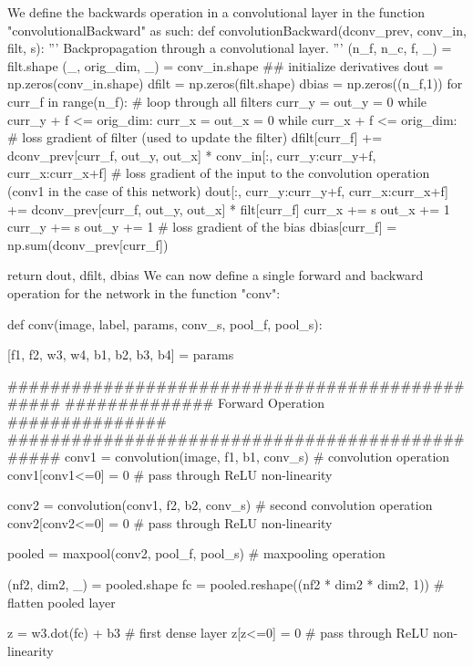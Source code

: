 \stopsubsection

\startsubsection[title=Forward and backward operation of network]
We define the backwards operation in a convolutional layer in the function "convolutionalBackward" as such:
\starttyping
def convolutionBackward(dconv_prev, conv_in, filt, s):
    '''
    Backpropagation through a convolutional layer. 
    '''
    (n_f, n_c, f, _) = filt.shape
    (_, orig_dim, _) = conv_in.shape
    ## initialize derivatives
    dout = np.zeros(conv_in.shape) 
    dfilt = np.zeros(filt.shape)
    dbias = np.zeros((n_f,1))
    for curr_f in range(n_f):
        # loop through all filters
        curr_y = out_y = 0
        while curr_y + f <= orig_dim:
            curr_x = out_x = 0
            while curr_x + f <= orig_dim:
                # loss gradient of filter (used to update the filter)
                dfilt[curr_f] += dconv_prev[curr_f, out_y, out_x] * conv_in[:, curr_y:curr_y+f, curr_x:curr_x+f]
                # loss gradient of the input to the convolution operation (conv1 in the case of this network)
                dout[:, curr_y:curr_y+f, curr_x:curr_x+f] += dconv_prev[curr_f, out_y, out_x] * filt[curr_f] 
                curr_x += s
                out_x += 1
            curr_y += s
            out_y += 1
        # loss gradient of the bias
        dbias[curr_f] = np.sum(dconv_prev[curr_f])
    
    return dout, dfilt, dbias
\stoptyping
We can now define a single forward and backward operation for the network in the function "conv":

\starttyping
def conv(image, label, params, conv_s, pool_f, pool_s):
    
    [f1, f2, w3, w4, b1, b2, b3, b4] = params 
    
    ################################################
    ############## Forward Operation ###############
    ################################################
    conv1 = convolution(image, f1, b1, conv_s) # convolution operation
    conv1[conv1<=0] = 0 # pass through ReLU non-linearity
    
    conv2 = convolution(conv1, f2, b2, conv_s) # second convolution operation
    conv2[conv2<=0] = 0 # pass through ReLU non-linearity
    
    pooled = maxpool(conv2, pool_f, pool_s) # maxpooling operation
    
    (nf2, dim2, _) = pooled.shape
    fc = pooled.reshape((nf2 * dim2 * dim2, 1)) # flatten pooled layer
    
    z = w3.dot(fc) + b3 # first dense layer
    z[z<=0] = 0 # pass through ReLU non-linearity
    
